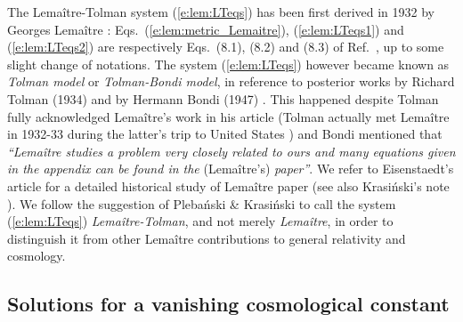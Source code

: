 \begin{hist}
The Lemaître-Tolman system (\ref{e:lem:LTeqs}) has been first derived
in 1932 by Georges Lemaître \cite{Lemai32}:
Eqs.~(\ref{e:lem:metric_Lemaitre}), (\ref{e:lem:LTeqs1}) and (\ref{e:lem:LTeqs2}) are
respectively Eqs.~(8.1), (8.2) and (8.3) of Ref.~\cite{Lemai32}, up to some slight
change of notations.
The system (\ref{e:lem:LTeqs}) however became known as \emph{Tolman model}
or \emph{Tolman-Bondi model}, in reference
to posterior works by Richard Tolman (1934) \cite{Tolma34}
and by Hermann Bondi (1947) \cite{Bondi47}.
This happened despite Tolman fully acknowledged Lemaître's work \cite{Lemai32} in his
article \cite{Tolma34} (Tolman actually met Lemaître in 1932-33 during
the latter's trip to United States \cite{Eisen93}) and Bondi \cite{Bondi47} mentioned
that \emph{``Lemaître studies a problem very closely related to ours
and many equations given in the appendix can be found in the} (Lemaître's) \emph{paper''}.
We refer to Eisenstaedt's article \cite{Eisen93} for a detailed historical
study of Lemaître paper \cite{Lemai32} (see also Krasi\'nski's note \cite{Krasi97}).
We follow the suggestion of Pleba\'nski \& Krasi\'nski \cite{PlebaK06}
to call the system (\ref{e:lem:LTeqs}) \emph{Lemaître-Tolman}, and not
merely \emph{Lemaître}, in order to distinguish it from other Lemaître contributions
to general relativity and cosmology.
\end{hist}


\subsection{Solutions for a vanishing cosmological constant} \label{s:lem:sol_lambda_zero}

